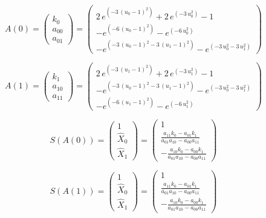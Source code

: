 \documentclass{article}
\begin{document}
\[
  A\left(0\right) = \left(\begin{array}{r}
k_{0} \\
{a}_{00} \\
{a}_{01}
\end{array}\right) = \left(\begin{array}{r}
2 \, e^{\left(-3 \, {\left(u_{0} - 1\right)}^{2}\right)} + 2 \, e^{\left(-3 \, u_{0}^{2}\right)} - 1 \\
-e^{\left(-6 \, {\left(u_{0} - 1\right)}^{2}\right)} - e^{\left(-6 \, u_{0}^{2}\right)} \\
-e^{\left(-3 \, {\left(u_{0} - 1\right)}^{2} - 3 \, {\left(u_{1} - 1\right)}^{2}\right)} - e^{\left(-3 \, u_{0}^{2} - 3 \, u_{1}^{2}\right)}
\end{array}\right)
\]

\[
  A\left(1\right) = \left(\begin{array}{r}
k_{1} \\
{a}_{10} \\
{a}_{11}
\end{array}\right) = \left(\begin{array}{r}
2 \, e^{\left(-3 \, {\left(u_{1} - 1\right)}^{2}\right)} + 2 \, e^{\left(-3 \, u_{1}^{2}\right)} - 1 \\
-e^{\left(-3 \, {\left(u_{0} - 1\right)}^{2} - 3 \, {\left(u_{1} - 1\right)}^{2}\right)} - e^{\left(-3 \, u_{0}^{2} - 3 \, u_{1}^{2}\right)} \\
-e^{\left(-6 \, {\left(u_{1} - 1\right)}^{2}\right)} - e^{\left(-6 \, u_{1}^{2}\right)}
\end{array}\right)
\]

\[
  S\left(A\left(0\right)\right) = \left(\begin{array}{r}
1 \\
\hat{X}_{0} \\
\hat{X}_{1}
\end{array}\right) = \left(\begin{array}{r}
1 \\
\frac{{a}_{11} k_{0} - {a}_{01} k_{1}}{{a}_{01} {a}_{10} - {a}_{00} {a}_{11}} \\
-\frac{{a}_{10} k_{0} - {a}_{00} k_{1}}{{a}_{01} {a}_{10} - {a}_{00} {a}_{11}}
\end{array}\right)
\]

\[
  S\left(A\left(1\right)\right) = \left(\begin{array}{r}
1 \\
\hat{X}_{0} \\
\hat{X}_{1}
\end{array}\right) = \left(\begin{array}{r}
1 \\
\frac{{a}_{11} k_{0} - {a}_{01} k_{1}}{{a}_{01} {a}_{10} - {a}_{00} {a}_{11}} \\
-\frac{{a}_{10} k_{0} - {a}_{00} k_{1}}{{a}_{01} {a}_{10} - {a}_{00} {a}_{11}}
\end{array}\right)
\]
\end{document}

